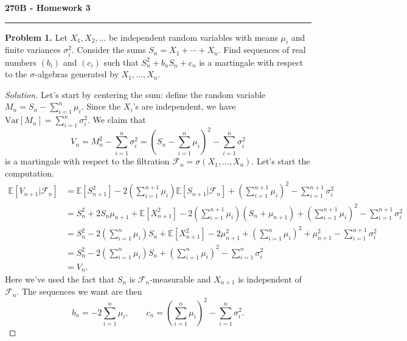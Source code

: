 \documentclass[11pt,letterpaper]{report}
\newcommand{\mcal}[1]{\mathcal{#1}}
\newcommand{\E}{\mathbb{E}}
\newcommand{\Var}{\text{Var}}
\newenvironment{solution}
{\begin{proof}[Solution]}
{\end{proof}}
\begin{document}
\begin{center}
{\bf \Large 270B - Homework 3}
\vspace{0.2cm}
\hrule
\end{center}

\noindent\textbf{Problem 1. }
Let $X_1, X_2, \ldots$ be independent random variables with means $\mu_i$ and finite variances $\sigma_i^2$. Consider the sums $S_n = X_1 + \cdots + X_n$. Find sequences of real numbers $(b_i)$ and $(c_i)$ such that $S_n^2 + b_nS_n + c_n$ is a martingale with respect to the $\sigma$-algebras generated by $X_1, \ldots, X_n$.
\begin{solution}
	Let's start by centering the sum: define the random variable $M_n = S_n - \sum_{i=1}^n \mu_i$. Since the $X_i$'s are independent, we have $\Var[M_n] = \sum_{i=1}^n \sigma_i^2$. We claim that
	\[
	V_n = M_n^2 - \sum_{i=1}^n\sigma_i^2 = \left(S_n - \sum_{i=1}^n\mu_i\right)^2 - \sum_{i=1}^n\sigma_i^2
	\]
	is a martingale with respect to the filtration $\mcal{F}_n = \sigma(X_1, \ldots, X_n)$. Let's start the computation.
	\begin{align*}
		\E[V_{n+1}|\mcal{F}_n] &= \E[S_{n+1}^2] - 2\left(\sum_{i=1}^{n+1}\mu_i\right)\E[S_{n+1}|\mcal{F}_n] + \left(\sum_{i=1}^{n+1}\mu_i\right)^2 - \sum_{i=1}^{n+1}\sigma_i^2\\
		&= S_n^2 + 2S_n\mu_{n+1} + \E[X_{n+1}^2] - 2\left(\sum_{i=1}^{n+1}\mu_i\right)(S_n + \mu_{n+1}) + \left(\sum_{i=1}^{n+1}\mu_i\right)^2 - \sum_{i=1}^{n+1}\sigma_i^2\\
		&= S_n^2 -2\left(\sum_{i=1}^n\mu_i\right)S_n + \E[X_{n+1}^2] - 2\mu_{n+1}^2 + \left(\sum_{i=1}^n\mu_i\right)^2 + \mu_{n+1}^2 - \sum_{i=1}^{n+1}\sigma_i^2\\
		&= S_n^2 - 2\left(\sum_{i=1}^n\mu_i\right)S_n + \left(\sum_{i=1}^n\mu_i\right)^2 - \sum_{i=1}^n\sigma_i^2\\
		&= V_n.
	\end{align*}
	Here we've used the fact that $S_n$ is $\mcal{F}_n$-measurable and $X_{n+1}$ is independent of $\mcal{F}_n$. The sequences we want are then
	\[
	b_n = -2\sum_{i=1}^n\mu_i,\qquad c_n = \left(\sum_{i=1}^n\mu_i\right)^2 - \sum_{i=1}^n\sigma_i^2.
	\]
\end{solution}
\end{document}
